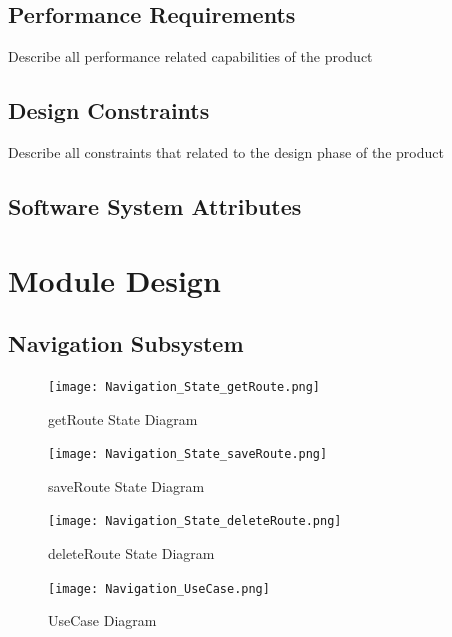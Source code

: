 \documentclass{article}
\begin{document}
			\subsection{Performance Requirements}\label{subsec:performance}
				Describe all performance related capabilities of the product
			\subsection{Design Constraints}\label{subsec:design constraints}	
				Describe all constraints that related to the design phase of the product
			\subsection{Software System Attributes}\label{subsec:attributes}

		\newpage

		\section{Module Design}\label{sec:moduels}	
			\subsection{Navigation Subsystem}\label{subsec:navigation}
				\begin{figure}[H]
                     \texttt{[image: Navigation\_State\_getRoute.png]}
                     \caption{getRoute State Diagram}
					 \label{fig:navigation_state_getRoute}
			    \end{figure}
			    
			    \begin{figure}[H]
                     \texttt{[image: Navigation\_State\_saveRoute.png]}
                     \caption{saveRoute State Diagram}
					 \label{fig:navigation_state_saveRoute}
			    \end{figure}
			    
			    \begin{figure}[H]
                     \texttt{[image: Navigation\_State\_deleteRoute.png]}
                     \caption{deleteRoute State Diagram}
					 \label{fig:navigation_state_deleteRoute}
			    \end{figure}
			    
			    \begin{figure}[H]
                     \texttt{[image: Navigation\_UseCase.png]}
                     \caption{UseCase Diagram}
					 \label{fig:navigation_UseCase}
			    \end{figure}
\end{document}
